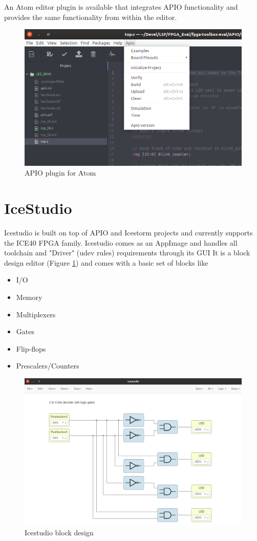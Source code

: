 An Atom editor plugin is available that integrates APIO functionality and provides the same functionality from within the editor.
\begin{figure}[h!]
\includegraphics[width=1\textwidth]{Images/APIO_Atom.png}
\caption{APIO plugin for Atom}
\end{figure}
\section{IceStudio}
Icestudio is built on top of APIO and Icestorm projects and currently supports the ICE40 FPGA family. Icestudio comes as an AppImage and handles all toolchain and "Driver" (udev rules) requirements through its GUI
It is a block design editor (Figure \ref{ref:icestudio_block}) and comes with a basic set of blocks like

\begin{itemize}
\item I/O
\item Memory
\item Multiplexers
\item Gates
\item Flip-flops
\item Prescalers/Counters
\end{itemize}

\begin{figure}[ht]
\includegraphics[width=1\textwidth]{Images/icestudio_blocks.png}
\caption{Icestudio block design}
\label{ref:icestudio_block}
\end{figure}

